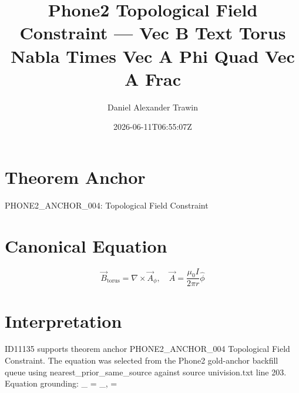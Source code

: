 \documentclass[11pt]{article}
\title{Phone2 Topological Field Constraint — Vec B Text Torus Nabla Times Vec A Phi Quad Vec A Frac}
\author{Daniel Alexander Trawin}
\date{2026-06-11T06:55:07Z}
\begin{document}
\maketitle
\section*{Theorem Anchor}
PHONE2_ANCHOR_004: Topological Field Constraint
\section*{Canonical Equation}
\[
\vec{B}_{\text{torus}} = \nabla \times \vec{A}_\phi, \quad \vec{A} = \frac{\mu_0 I}{2\pi r}\hat{\phi}
\]
\section*{Interpretation}
ID11135 supports theorem anchor PHONE2_ANCHOR_004 Topological Field Constraint. The equation was selected from the Phone2 gold-anchor backfill queue using nearest_prior_same_source against source univision.txt line 203. Equation grounding: _{} = \nabla \times {}_\phi, \quad {} = \hat{\phi}
\end{document}
